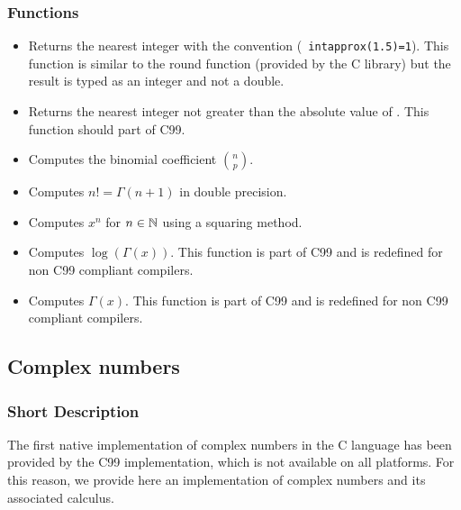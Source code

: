 \subsubsection{Functions}
\begin{itemize}
\item {}
  \sshortdescribe Returns the nearest integer with the convention ({\tt
    intapprox(1.5)=1}). This function is similar to the round function
  (provided by the C library) but the result is typed as an integer and not a
  double.

\item {}
  \sshortdescribe Returns the nearest integer not greater than the absolute
  value of . This function should part of C99.

\item {}
  \sshortdescribe Computes the binomial coefficient $\binom{n}{p}$.

\item {}
  \sshortdescribe Computes $n! = \Gamma(n+1)$ in double precision.

\item {}
  \sshortdescribe Computes $x^n$ for $n \in {\mathbb N}$ using a squaring method.

\item {}
  \sshortdescribe Computes $\log(\Gamma(x))$. This function is part of C99 and is
  redefined for non C99 compliant compilers.

\item {}
  \sshortdescribe Computes $\Gamma(x)$. This function is part of C99 and is
  redefined for non C99 compliant compilers.

\end{itemize}

\subsection{Complex numbers}
\subsubsection{Short Description}

The first native implementation of complex numbers in the C language has been
provided by the C99 implementation, which is not available on all
platforms. For this reason, we provide here an implementation of complex
numbers and its associated calculus.

